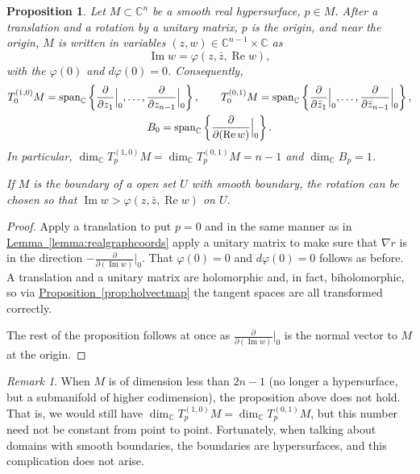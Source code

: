 \documentclass[12pt,openany]{book}
\newcommand{\avoidbreak}{\postdisplaypenalty=100}
\renewcommand{\Re}{\operatorname{Re}}
\renewcommand{\Im}{\operatorname{Im}}
\newcommand{\C}{{\mathbb{C}}}
\theoremstyle{plain}
\newtheorem{prop}[thm]{Proposition}
\theoremstyle{remark}
\newtheorem{remark}[thm]{Remark}
\theoremstyle{definition}
\theoremstyle{exercise}
\theoremstyle{example}
\newcommand{\propref}[1]{\hyperref[#1]{Proposition~\ref*{#1}}}
\newcommand{\lemmaref}[1]{\hyperref[#1]{Lemma~\ref*{#1}}}
\begin{document}
\begin{prop} \label{prop:graphcoordinatesCn}
\pagebreak[2]
Let $M \subset \C^n$ be a smooth real hypersurface, $p \in M$.
After a translation and a rotation by a unitary
matrix, $p$ is the origin, and near the origin,
$M$ is written in variables $(z,w) \in \C^{n-1}
\times \C$ as
\begin{equation*}
\Im w = \varphi(z,\bar{z},\Re w) ,
\end{equation*}
with the $\varphi(0)$  and $d\varphi(0) = 0$.  Consequently,
\begin{gather*}
T_0^{(1,0)} M
= \operatorname{span}_{\C} \left\{
\frac{\partial}{\partial z_1}\Big|_0,
\ldots,
\frac{\partial}{\partial z_{n-1}}\Big|_0 \right\} ,
\qquad
T_0^{(0,1)} M
= \operatorname{span}_{\C} \left\{
\frac{\partial}{\partial \bar{z}_1}\Big|_0,
\ldots,
\frac{\partial}{\partial \bar{z}_{n-1}}\Big|_0 \right\} ,
\\
B_0 = \operatorname{span}_{\C} \left\{
\frac{\partial}{\partial (\Re w)}\Big|_0 \right\} .
\avoidbreak
\end{gather*}
In particular,
$\dim_\C T_p^{(1,0)} M = \dim_\C T_p^{(0,1)} M = n-1$ and
$\dim_\C B_p = 1$.

\nopagebreak
If $M$ is the boundary of a open set $U$ with smooth boundary,
the rotation can be chosen so that
$\Im w > \varphi(z,\bar{z},\Re w)$ on $U$.
\end{prop}

\begin{proof}
Apply a translation to put $p=0$ and in the
same manner as in \lemmaref{lemma:realgraphcoords}
apply a unitary matrix to make sure that $\nabla r$ is
in the direction
$-\frac{\partial}{\partial (\Im w)}\big|_0$.  That $\varphi(0) = 0$
and $d\varphi(0) = 0$ follows as before.
A translation and a unitary matrix are holomorphic
and, in fact, biholomorphic, so
via \propref{prop:holvectmap} the tangent spaces are all
transformed correctly.

The rest of the proposition follows at once as
$\frac{\partial}{\partial (\Im w)}\big|_0$ is the normal vector to $M$
at the origin.
\end{proof}

\begin{remark}
When $M$ is of dimension less than $2n-1$ (no longer a hypersurface, but
a submanifold of higher codimension), the proposition above does not hold.
That is, we would still have $\dim_\C T_p^{(1,0)} M = \dim_\C T_p^{(0,1)}
M$, but this number need not be constant from point to point.  Fortunately,
when talking about domains with smooth boundaries, the boundaries are
hypersurfaces, and this complication does not arise.
\end{remark}
\end{document}
